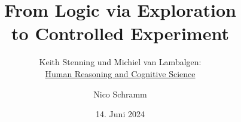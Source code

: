 
\title[From Logic via Exploration to Controlled Experiment]
    {From Logic via Exploration\\to Controlled Experiment}

\subtitle[Keith Stenning und Michiel von Lambalgen: Human Reasoning and Cognitive Science]
    {Keith Stenning und Michiel van Lambalgen:\\
        \href{https://doi.org/10.7551/mitpress/7964.001.0001}{Human Reasoning and Cognitive Science}}

\date{14. Juni 2024}
\author[N. Schramm]{Nico Schramm}

